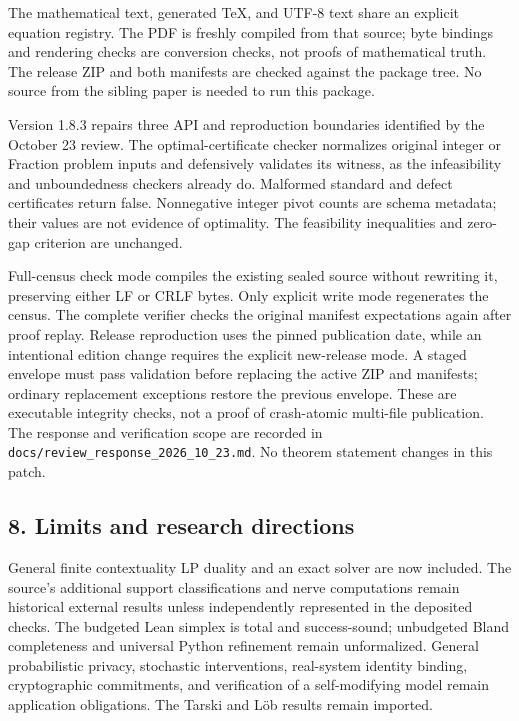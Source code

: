 \documentclass[
  10pt,
]{article}
\begin{document}
The mathematical text, generated TeX, and UTF-8 text share an explicit equation registry. The PDF is freshly compiled from that source; byte bindings and rendering checks are conversion checks, not proofs of mathematical truth. The release ZIP and both manifests are checked against the package tree. No source from the sibling paper is needed to run this package.

Version 1.8.3 repairs three API and reproduction boundaries identified by the October 23 review. The optimal-certificate checker normalizes original integer or Fraction problem inputs and defensively validates its witness, as the infeasibility and unboundedness checkers already do. Malformed standard and defect certificates return false. Nonnegative integer pivot counts are schema metadata; their values are not evidence of optimality. The feasibility inequalities and zero-gap criterion are unchanged.

Full-census check mode compiles the existing sealed source without rewriting it, preserving either LF or CRLF bytes. Only explicit write mode regenerates the census. The complete verifier checks the original manifest expectations again after proof replay. Release reproduction uses the pinned publication date, while an intentional edition change requires the explicit new-release mode. A staged envelope must pass validation before replacing the active ZIP and manifests; ordinary replacement exceptions restore the previous envelope. These are executable integrity checks, not a proof of crash-atomic multi-file publication. The response and verification scope are recorded in \texttt{docs/review\_response\_2026\_10\_23.md}. No theorem statement changes in this patch.

\subsection{8. Limits and research directions}\label{limits-and-research-directions}

General finite contextuality LP duality and an exact solver are now included. The source's additional support classifications and nerve computations remain historical external results unless independently represented in the deposited checks. The budgeted Lean simplex is total and success-sound; unbudgeted Bland completeness and universal Python refinement remain unformalized. General probabilistic privacy, stochastic interventions, real-system identity binding, cryptographic commitments, and verification of a self-modifying model remain application obligations. The Tarski and Löb results remain imported.
\end{document}
